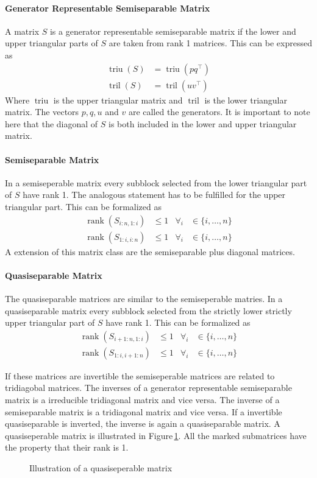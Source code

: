 \documentclass[doctype=mastersthesis,BCOR=15mm,biblatex]{ldvbook}%
\DeclareMathOperator{\rank}{rank}
\DeclareMathOperator{\triu}{triu}
\DeclareMathOperator{\tril}{tril}
\begin{document}
\paragraph{Generator Representable Semiseparable Matrix}
A matrix $S$ is a generator representable semiseparable matrix if the lower and upper triangular parts of $S$ are taken from rank 1 matrices.
This can be expressed as 
\begin{align}
	\triu(S) &= \triu(pq^\top)\\
	\tril(S) &= \tril(uv^\top)
\end{align}
Where $\triu$ is the upper triangular matrix and $\tril$ is the lower triangular matrix. The vectors $p,q,u$ and $v$ are called the generators.
It is important to note here that the diagonal of $S$ is both included in the lower and upper triangular matrix.

\paragraph{Semiseparable Matrix}
In a semiseperable matrix every subblock selected from the lower triangular part of $S$ have rank 1. The analogous statement has to be fulfilled for the upper triangular part.
This can be formalized as 
\begin{align}
	\rank(S_{i:n,1:i}) &\leq 1 & \forall_i &\in\{i,\dots,n\}\\
	\rank(S_{1:i,i:n}) &\leq 1 & \forall_i &\in\{i,\dots,n\}
\end{align}
A extension of this matrix class are the semiseparable plus diagonal matrices.

\paragraph{Quasiseparable Matrix}
The quasiseparable matrices are similar to the semiseperable matries. In a quasiseparable matrix every subblock selected from the strictly lower strictly upper triangular part of $S$ have rank 1. 
This can be formalized as 
\begin{align}
\rank(S_{i+1:n,1:i}) &\leq 1 & \forall_i &\in\{i,\dots,n\}\\
\rank(S_{1:i,i+1:n}) &\leq 1 & \forall_i &\in\{i,\dots,n\}
\end{align}


If these matrices are invertible the semiseperable matrices are related to tridiagobal matrices.
The inverses of a generator representable semiseparable matrix is a irreducible tridiagonal matrix and vice versa. 
The inverse of a semiseparable matrix is a tridiagonal matrix and vice versa.
If a invertible quasiseparable is inverted, the inverse is again a quasiseparable matrix.
A quasiseperable matrix is illustrated in Figure\,\ref{fig:quasiseperable}. All the marked submatrices have the property that their rank is 1.
\begin{figure}
	\centering
	
	\caption{Illustration of a quasiseperable matrix}
	\label{fig:quasiseperable}
\end{figure}
\end{document}
